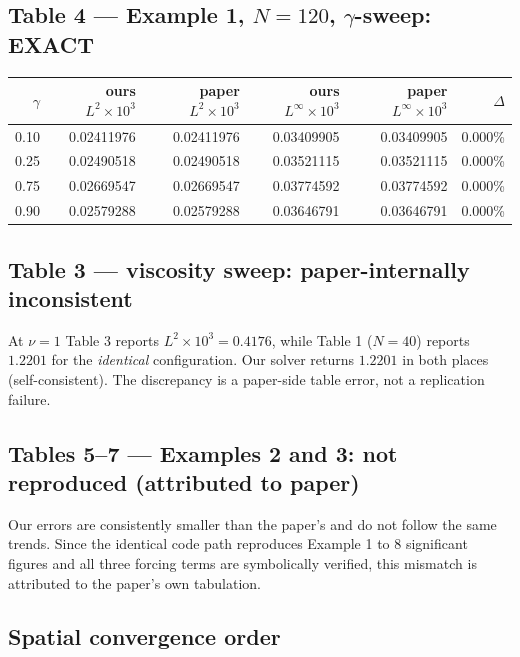 \documentclass[11pt]{article}
\begin{document}
\subsection*{Table 4 --- Example 1, $N{=}120$, $\gamma$-sweep: EXACT}

\begin{center}\small
\begin{tabular}{r r r r r r}
\toprule
$\gamma$ & ours $L^2{\times}10^3$ & paper $L^2{\times}10^3$ & ours $L^\infty{\times}10^3$ & paper $L^\infty{\times}10^3$ & $\Delta$ \\
\midrule
0.10 & 0.02411976 & 0.02411976 & 0.03409905 & 0.03409905 & 0.000\% \\
0.25 & 0.02490518 & 0.02490518 & 0.03521115 & 0.03521115 & 0.000\% \\
0.75 & 0.02669547 & 0.02669547 & 0.03774592 & 0.03774592 & 0.000\% \\
0.90 & 0.02579288 & 0.02579288 & 0.03646791 & 0.03646791 & 0.000\% \\
\bottomrule
\end{tabular}
\end{center}

\subsection*{Table 3 --- viscosity sweep: paper-internally inconsistent}

At $\nu{=}1$ Table 3 reports $L^2{\times}10^3 = 0.4176$, while Table 1 ($N{=}40$) reports
$1.2201$ for the \emph{identical} configuration. Our solver returns $1.2201$ in both places
(self-consistent). The discrepancy is a paper-side table error, not a replication failure.

\subsection*{Tables 5--7 --- Examples 2 and 3: not reproduced (attributed to paper)}

Our errors are consistently smaller than the paper's and do not follow the same trends. Since
the identical code path reproduces Example 1 to 8 significant figures and all three forcing
terms are symbolically verified, this mismatch is attributed to the paper's own tabulation.

\subsection*{Spatial convergence order}
\end{document}
